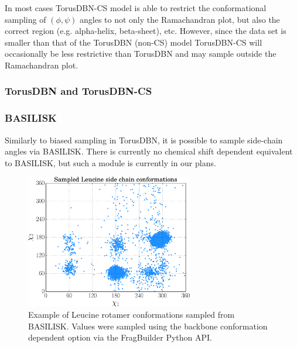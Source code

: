 In most cases TorusDBN-CS model is able to restrict the conformational sampling of $(\phi, \psi)$ angles to not only the Ramachandran plot, but also the correct region (e.g. alpha-helix, beta-sheet), etc.
However, since the data set is smaller than that of the TorusDBN (non-CS) model TorusDBN-CS will occasionally be less restrictive than TorusDBN and may sample outside the Ramachandran plot.



\subsubsection{TorusDBN and TorusDBN-CS}


\subsubsection{BASILISK}

Similarly to biased sampling in TorusDBN, it is possible to sample side-chain angles via BASILISK. There is currently no chemical shift dependent equivalent to BASILISK, but such a module is currently in our plans.


\begin{figure}
    \centering
    \includegraphics[width=0.65\textwidth]{figures/leu_sc.pdf}
    \caption{Example of Leucine rotamer conformations sampled from BASILISK. Values were sampled using the backbone conformation dependent option via the FragBuilder Python API.}
    \label{fig:leu_sc}
\end{figure}

